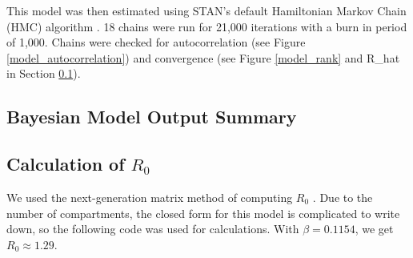 \documentclass[11pt]{article}
\begin{document}
    This model was then estimated using STAN's default Hamiltonian Markov Chain (HMC) algorithm \cite{standev2018stancore}. 18 chains were run for 21,000
    iterations with a burn in period of 1,000. Chains were checked for autocorrelation (see Figure \ref{model_autocorrelation})
    and convergence (see Figure \ref{model_rank} and R\_hat in Section \ref{stansummary}).

\subsection{Bayesian Model Output Summary}
\label{stansummary}

\subsection{Calculation of $R_0$}
We used the next-generation matrix method of computing $R_0$ \cite{brauer_mathematical_2019}.
Due to the number of compartments, the closed form for this model is complicated to write down, so the following
code was used for calculations. With $\beta=0.1154$, we get $R_0\approx1.29$.


\end{document}
